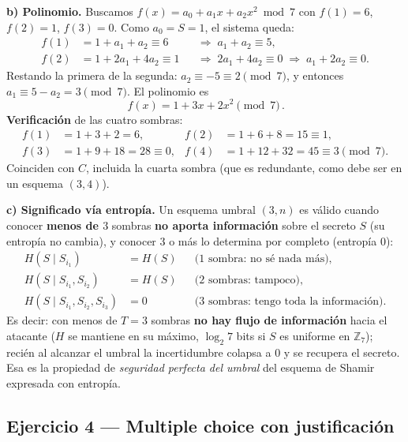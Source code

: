\textbf{b) Polinomio.} Buscamos $f(x)=a_0+a_1x+a_2x^2 \bmod 7$ con $f(1)=6$, $f(2)=1$,
$f(3)=0$. Como $a_0 = S = 1$, el sistema queda:
\begin{align*}
  f(1) &= 1 + a_1 + a_2 \equiv 6 &&\Rightarrow\; a_1 + a_2 \equiv 5,\\
  f(2) &= 1 + 2a_1 + 4a_2 \equiv 1 &&\Rightarrow\; 2a_1 + 4a_2 \equiv 0
          \;\Rightarrow\; a_1 + 2a_2 \equiv 0 .
\end{align*}
Restando la primera de la segunda: $a_2 \equiv -5 \equiv 2 \pmod 7$, y entonces
$a_1 \equiv 5 - a_2 = 3 \pmod 7$. El polinomio es
\begin{equation*}
  \boxed{\,f(x) = 1 + 3x + 2x^2 \pmod 7\,}.
\end{equation*}
\textbf{Verificación} de las cuatro sombras:
\begin{align*}
  f(1) &= 1+3+2 = 6, & f(2) &= 1+6+8 = 15 \equiv 1,\\
  f(3) &= 1+9+18 = 28 \equiv 0, & f(4) &= 1+12+32 = 45 \equiv 3 \pmod 7 .
\end{align*}
Coinciden con $C$, incluida la cuarta sombra (que es redundante, como debe ser en un esquema
$(3,4)$).

\textbf{c) Significado vía entropía.} Un esquema umbral $(3,n)$ es válido cuando conocer
\textbf{menos de $3$} sombras \textbf{no aporta información} sobre el secreto $S$ (su entropía
no cambia), y conocer $3$ o más lo determina por completo (entropía $0$):
\begin{equation*}
\begin{aligned}
  H(S \mid S_{i_1})            &= H(S)  && \text{(1 sombra: no sé nada más)},\\
  H(S \mid S_{i_1}, S_{i_2})   &= H(S)  && \text{(2 sombras: tampoco)},\\
  H(S \mid S_{i_1}, S_{i_2}, S_{i_3}) &= 0 && \text{(3 sombras: tengo toda la información)}.
\end{aligned}
\end{equation*}
Es decir: con menos de $T=3$ sombras \textbf{no hay flujo de información} hacia el atacante
($H$ se mantiene en su máximo, $\log_2 7$ bits si $S$ es uniforme en $\mathbb{Z}_7$); recién al
alcanzar el umbral la incertidumbre colapsa a $0$ y se recupera el secreto. Esa es la propiedad
de \emph{seguridad perfecta del umbral} del esquema de Shamir expresada con entropía.

\subsection{Ejercicio 4 --- Multiple choice con justificación}

